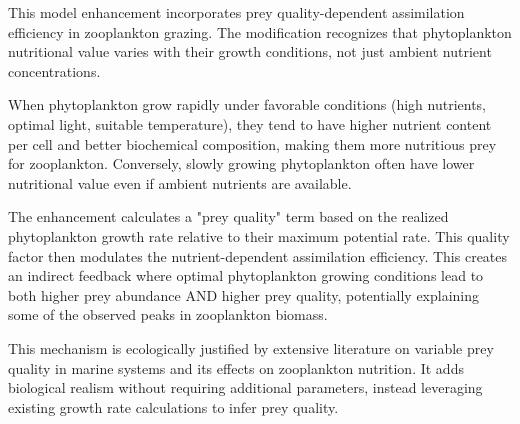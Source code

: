 This model enhancement incorporates prey quality-dependent assimilation efficiency in zooplankton grazing. The modification recognizes that phytoplankton nutritional value varies with their growth conditions, not just ambient nutrient concentrations.

When phytoplankton grow rapidly under favorable conditions (high nutrients, optimal light, suitable temperature), they tend to have higher nutrient content per cell and better biochemical composition, making them more nutritious prey for zooplankton. Conversely, slowly growing phytoplankton often have lower nutritional value even if ambient nutrients are available.

The enhancement calculates a "prey quality" term based on the realized phytoplankton growth rate relative to their maximum potential rate. This quality factor then modulates the nutrient-dependent assimilation efficiency. This creates an indirect feedback where optimal phytoplankton growing conditions lead to both higher prey abundance AND higher prey quality, potentially explaining some of the observed peaks in zooplankton biomass.

This mechanism is ecologically justified by extensive literature on variable prey quality in marine systems and its effects on zooplankton nutrition. It adds biological realism without requiring additional parameters, instead leveraging existing growth rate calculations to infer prey quality.

